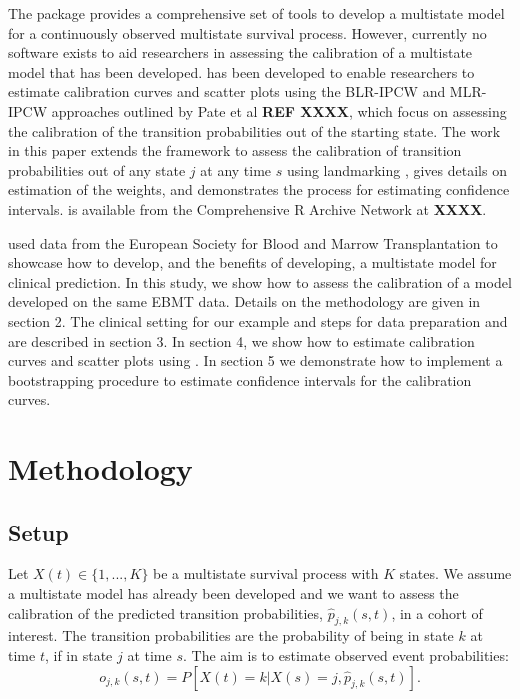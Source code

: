 \documentclass[nojss]{jss}
\begin{document}
The  package  \citep{DeWreede2011} provides a comprehensive set of tools to develop a multistate model for a continuously observed multistate survival process. However, currently no software exists to aid researchers in assessing the calibration of a multistate model that has been developed.  has been developed to enable researchers to estimate calibration curves and scatter plots using the BLR-IPCW and MLR-IPCW approaches outlined by Pate et al \textbf{REF XXXX}, which focus on assessing the calibration of the transition probabilities out of the starting state. The work in this paper extends the framework to assess the calibration of transition probabilities out of any state $j$ at any time $s$ using landmarking \citep{Houwelingen2007, Dafni2011}, gives details on estimation of the weights, and demonstrates the process for estimating confidence intervals.  is available from the Comprehensive R Archive Network at \textbf{XXXX}.

\cite{DeWreede2011} used data from the European Society for Blood and Marrow Transplantation \citep{EBMT2023} to showcase how to develop, and the benefits of developing, a multistate model for clinical prediction. In this study, we show how to assess the calibration of a model developed on the same EBMT data. Details on the methodology are given in section 2. The clinical setting for our example and steps for data preparation and are described in section 3. In section 4, we show how to estimate calibration curves and scatter plots using . In section 5 we demonstrate how to implement a bootstrapping procedure to estimate confidence intervals for the calibration curves.

\section{Methodology} \label{sec:methodology}

\subsection{Setup} \label{sec:setup}

Let $X(t) \in \{1, ..., K\}$ be a multistate survival process with $K$ states. We assume a multistate model has already been developed and we want to assess the calibration of the predicted transition probabilities, $\hat{p}_{j,k}(s, t)$, in a cohort of interest. The transition probabilities are the probability of being in state $k$ at time $t$, if in state $j$ at time $s$. The aim is to estimate observed event probabilities: $$o_{j,k}(s,t) = P[X(t)=k|X(s) = j, \hat{p}_{j,k}(s,t)].$$
\end{document}
